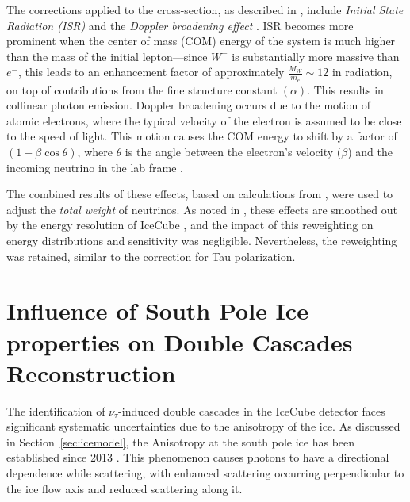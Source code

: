 The corrections applied to the cross-section, as described in \cite{glashow_correcttion1}, include \emph{Initial State Radiation (ISR)}  and the \emph{Doppler broadening effect} . ISR becomes more prominent when the center of mass (COM) energy of the system is much higher than the mass of the initial lepton—since \(W^-\) is substantially more massive than \(e^-\), this leads to an enhancement factor of approximately \(\frac{M_W}{m_e} \sim 12\) in radiation, on top of contributions from the fine structure constant \((\alpha)\). This results in collinear photon emission. Doppler broadening occurs due to the motion of atomic electrons, where the typical velocity of the electron is assumed to be close to the speed of light. This motion causes the COM energy to shift by a factor of \((1 - \beta \cos\theta)\), where \(\theta\) is the angle between the electron's velocity (\(\beta\)) and the incoming neutrino in the lab frame \cite{glashow_correcttion4}. 

The combined results of these effects, based on calculations from \cite{glashow_correcttion1}, were used to adjust the \emph{total weight} of neutrinos. As noted in \cite{glashow_correcttion1}, these effects are smoothed out by the energy resolution of IceCube , and the impact of this reweighting on energy distributions and sensitivity was negligible. Nevertheless, the reweighting was retained, similar to the correction for Tau polarization.

\section{Influence of South Pole Ice properties on Double Cascades Reconstruction}
\label{sec:icemodel_checks}
The identification of $\nu_{\tau}$-induced double cascades in the IceCube detector faces significant systematic uncertainties due to the anisotropy of the ice. As discussed in Section~\ref{sec:icemodel}, the Anisotropy at the south pole ice has been established since 2013 . This phenomenon causes photons to have a directional dependence while scattering, with enhanced scattering occurring perpendicular to the ice flow axis and reduced scattering along it. 

